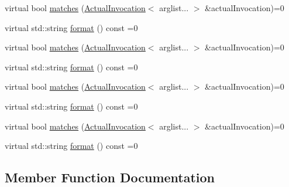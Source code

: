 \begin{DoxyCompactItemize}
\item 
virtual bool \mbox{\hyperlink{structfakeit_1_1ActualInvocation_1_1Matcher_a7459c74697253717984b5e86c9e30ae6}{matches}} (\mbox{\hyperlink{structfakeit_1_1ActualInvocation}{Actual\+Invocation}}$<$ arglist... $>$ \&actual\+Invocation)=0
\item 
virtual std\+::string \mbox{\hyperlink{structfakeit_1_1ActualInvocation_1_1Matcher_ae19e50f7b3a2cd2a9d6670acbaa47c32}{format}} () const =0
\item 
virtual bool \mbox{\hyperlink{structfakeit_1_1ActualInvocation_1_1Matcher_a7459c74697253717984b5e86c9e30ae6}{matches}} (\mbox{\hyperlink{structfakeit_1_1ActualInvocation}{Actual\+Invocation}}$<$ arglist... $>$ \&actual\+Invocation)=0
\item 
virtual std\+::string \mbox{\hyperlink{structfakeit_1_1ActualInvocation_1_1Matcher_ae19e50f7b3a2cd2a9d6670acbaa47c32}{format}} () const =0
\item 
virtual bool \mbox{\hyperlink{structfakeit_1_1ActualInvocation_1_1Matcher_a7459c74697253717984b5e86c9e30ae6}{matches}} (\mbox{\hyperlink{structfakeit_1_1ActualInvocation}{Actual\+Invocation}}$<$ arglist... $>$ \&actual\+Invocation)=0
\item 
virtual std\+::string \mbox{\hyperlink{structfakeit_1_1ActualInvocation_1_1Matcher_ae19e50f7b3a2cd2a9d6670acbaa47c32}{format}} () const =0
\item 
virtual bool \mbox{\hyperlink{structfakeit_1_1ActualInvocation_1_1Matcher_a7459c74697253717984b5e86c9e30ae6}{matches}} (\mbox{\hyperlink{structfakeit_1_1ActualInvocation}{Actual\+Invocation}}$<$ arglist... $>$ \&actual\+Invocation)=0
\item 
virtual std\+::string \mbox{\hyperlink{structfakeit_1_1ActualInvocation_1_1Matcher_ae19e50f7b3a2cd2a9d6670acbaa47c32}{format}} () const =0
\end{DoxyCompactItemize}


\subsection{Member Function Documentation}
\mbox{\label{structfakeit_1_1ActualInvocation_1_1Matcher_ae19e50f7b3a2cd2a9d6670acbaa47c32}} 
